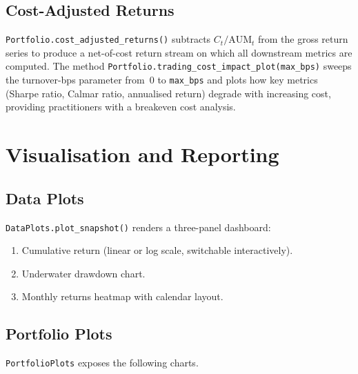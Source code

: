\documentclass[11pt,a4paper]{article}
\begin{document}
\subsection{Cost-Adjusted Returns}

\texttt{Portfolio.cost\_adjusted\_returns()} subtracts $C_t / \mathrm{AUM}_t$
from the gross return series to produce a net-of-cost return stream on which
all downstream metrics are computed.  The method
\texttt{Portfolio.trading\_cost\_impact\_plot(max\_bps)} sweeps the
turnover-bps parameter from~0 to \texttt{max\_bps} and plots how key metrics
(Sharpe ratio, Calmar ratio, annualised return) degrade with increasing cost,
providing practitioners with a breakeven cost analysis.

\section{Visualisation and Reporting}
\label{sec:plots}

\subsection{Data Plots}

\texttt{DataPlots.plot\_snapshot()} renders a three-panel dashboard:
\begin{enumerate}
  \item Cumulative return (linear or log scale, switchable interactively).
  \item Underwater drawdown chart.
  \item Monthly returns heatmap with calendar layout.
\end{enumerate}

\subsection{Portfolio Plots}

\texttt{PortfolioPlots} exposes the following charts.
\end{document}
